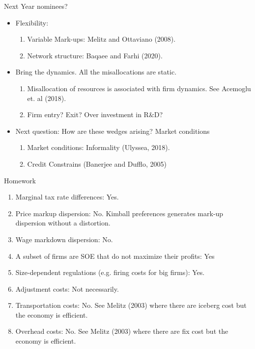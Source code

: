 \documentclass[usenames,dvipsnames,aspectratio=169]{beamer}
\begin{document}
\begin{frame}{Next Year nominees?} 
    \begin{itemize}[label=\textcolor{teal}{$\blacktriangleright$}]
        \item Flexibility:
        \begin{enumerate}[label=\textbf{\textcolor{teal}{\arabic*.}}]
            \item Variable Mark-ups: Melitz and Ottaviano (2008). 
            \item Network structure: Baqaee and Farhi (2020).
        \end{enumerate}
        \vfill
        \item Bring the dynamics. All the misallocations are static. 
        \begin{enumerate}[label=\textbf{\textcolor{teal}{\arabic*.}}]
            \item Misallocation of resources is associated with firm dynamics. See Acemoglu et. al (2018). 
            \item Firm entry? Exit? Over investment in R\&D? 
        \end{enumerate}
        \vfill
        \item Next question: How are these wedges arising? Market conditions
        \begin{enumerate}[label=\textbf{\textcolor{teal}{\arabic*.}}]
            \item Market conditions: Informality (Ulyssea, 2018). 
            \item Credit Constrains (Banerjee and Dufflo, 2005)
        \end{enumerate}
    \end{itemize}
\end{frame}

\begin{frame}[allowframebreaks]{Homework}
\begin{enumerate}[label=\textbf{\textcolor{teal}{(\alph*)}},leftmargin=*]
    \item Marginal tax rate differences: Yes. 
    \item Price markup dispersion: No. Kimball preferences generates mark-up dispersion without a distortion. 
    \item Wage markdown dispersion: No.
    \item A subset of firms are SOE that do not maximize their profits: Yes
    \item Size-dependent regulations (e.g. firing costs for big firms): Yes. 
    \item Adjustment costs: Not necessarily.
    \item Transportation costs: No. See Melitz (2003) where there are iceberg cost but the economy is efficient. 
    \item Overhead costs: No. See Melitz (2003) where there are fix cost but the economy is efficient. 
\end{enumerate}

\end{frame}
\end{document}
